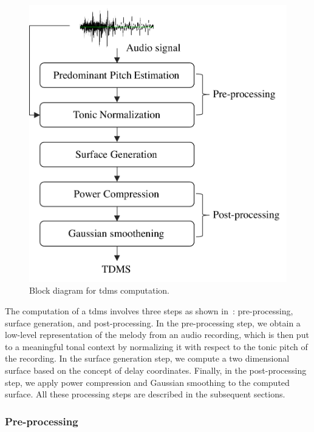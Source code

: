 \begin{figure}
	\begin{center}
		\includegraphics[width=\figSizeSixty]{ch07_ragaRecognition/figures/tdms_computation.pdf}
	\end{center}
	\caption{Block diagram for \gls{tdms} computation.}
	\label{fig:bd_tdms_computation}
\end{figure}

The computation of a \gls{tdms} involves three steps as shown in~: pre-processing, surface generation, and post-processing. In the pre-processing step, we obtain a low-level representation of the melody from an audio recording, which is then put to a meaningful tonal context by normalizing it with respect to the tonic pitch of the recording. In the surface generation step, we compute a two dimensional surface based on the concept of delay coordinates. Finally, in the post-processing step, we apply power compression and Gaussian smoothing to the computed surface. All these processing steps are described in the subsequent sections.

\subsubsection{Pre-processing} 
\label{sec:tdms_preprocessing}

